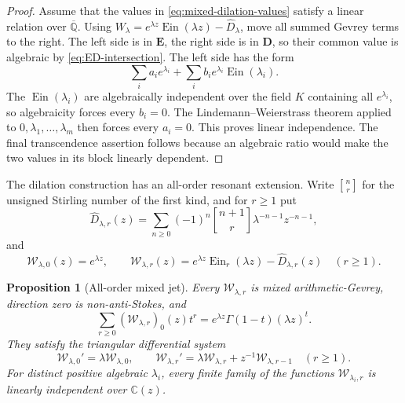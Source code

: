 \documentclass[11pt]{article}
\theoremstyle{keio}
\newtheorem{proposition}[theorem]{Proposition}
\theoremstyle{definition}
\theoremstyle{remark}
\newcommand{\Qbar}{\overline{\mathbb Q}}
\newcommand{\C}{\mathbb C}
\newcommand{\Ein}{\operatorname{Ein}}
\newcommand{\stirling}[2]{\genfrac{[}{]}{0pt}{}{#1}{#2}}
\begin{document}
\begin{proof}
Assume that the values in \eqref{eq:mixed-dilation-values} satisfy a
linear relation over \(\Qbar\).  Using
\(W_\lambda=e^{\lambda z}\Ein(\lambda z)-\widehat D_\lambda\), move all
summed Gevrey terms to the right.  The left side is in \(\mathbf E\), the
right side is in \(\mathbf D\), so their common value is algebraic by
\eqref{eq:ED-intersection}.  The left side has the form
\[
 \sum_i a_i e^{\lambda_i}
 +\sum_i b_i e^{\lambda_i}\Ein(\lambda_i).
\]
The \(\Ein(\lambda_i)\) are algebraically independent over the field \(K\)
containing all \(e^{\lambda_i}\), so algebraicity forces every \(b_i=0\).
The Lindemann--Weierstrass theorem applied to
\(0,\lambda_1,\ldots,\lambda_m\) then forces every \(a_i=0\).  This proves
linear independence.  The final transcendence assertion follows because
an algebraic ratio would make the two values in its block linearly
dependent.
\end{proof}

The dilation construction has an all-order resonant extension.  Write
\(\stirling{n}{r}\) for the unsigned Stirling number of the first kind, and for
\(r\ge1\) put
\begin{equation}\label{eq:all-order-Dhat}
 \widehat D_{\lambda,r}(z)=
 \sum_{n\ge0}(-1)^n\stirling{n+1}{r}
 \lambda^{-n-1}z^{-n-1},
\end{equation}
and
\begin{equation}\label{eq:all-order-mixed-family}
 \mathcal W_{\lambda,0}(z)=e^{\lambda z},\qquad
 \mathcal W_{\lambda,r}(z)
 =e^{\lambda z}\Ein_r(\lambda z)-\widehat D_{\lambda,r}(z)
 \quad(r\ge1).
\end{equation}

\begin{proposition}[All-order mixed jet]
\label{prop:all-order-mixed-jet}
Every \(\mathcal W_{\lambda,r}\) is mixed arithmetic-Gevrey, direction zero
is non-anti-Stokes, and
\begin{equation}\label{eq:all-order-mixed-generating}
 \boxed{\displaystyle
 \sum_{r\ge0}(\mathcal W_{\lambda,r})_0(z)t^r
 =e^{\lambda z}\Gamma(1-t)(\lambda z)^t.}
\end{equation}
They satisfy the triangular differential system
\begin{equation}\label{eq:all-order-mixed-system}
 \mathcal W_{\lambda,0}'=\lambda\mathcal W_{\lambda,0},
 \qquad
 \mathcal W_{\lambda,r}'
 =\lambda\mathcal W_{\lambda,r}+z^{-1}\mathcal W_{\lambda,r-1}
 \quad(r\ge1).
\end{equation}
For distinct positive algebraic \(\lambda_i\), every finite family of the
functions \(\mathcal W_{\lambda_i,r}\) is linearly independent over
\(\C(z)\).
\end{proposition}
\end{document}

